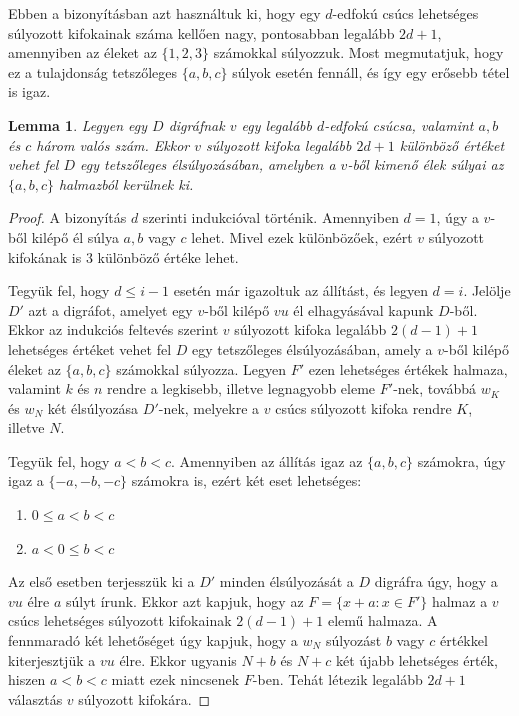 \documentclass[12pt, a4paper]{report}
\newtheorem{lem}[tét]{Lemma}
\theoremstyle{remark}
\theoremstyle{definition}
\begin{document}
Ebben a bizonyításban azt használtuk ki, hogy egy $d$-edfokú csúcs lehetséges súlyozott kifokainak száma kellően nagy, pontosabban legalább $2d + 1$, amennyiben az éleket az $\lbrace 1, 2, 3 \rbrace$ számokkal súlyozzuk. Most megmutatjuk, hogy ez a tulajdonság tetszőleges $\lbrace a, b, c \rbrace$ súlyok esetén fennáll, és így egy erősebb tétel is igaz.

\begin{lem}
Legyen egy $D$ digráfnak $v$ egy legalább $d$-edfokú csúcsa, valamint $a, b$ és $c$ három valós szám. Ekkor $v$ súlyozott kifoka legalább $2d + 1$ különböző értéket vehet fel $D$ egy tetszőleges élsúlyozásában, amelyben a $v$-ből kimenő élek súlyai az $\lbrace a, b, c \rbrace$ halmazból kerülnek ki.
\end{lem}

\begin{proof}
A bizonyítás $d$ szerinti indukcióval történik. Amennyiben $d = 1$, úgy a $v$-ből kilépő él súlya $a, b$ vagy $c$ lehet. Mivel ezek különbözőek, ezért $v$ súlyozott kifokának is $3$ különböző értéke lehet.

Tegyük fel, hogy $d \leq i - 1$ esetén már igazoltuk az állítást, és legyen $d = i$. Jelölje $D'$ azt a digráfot, amelyet egy $v$-ből kilépő $vu$ él elhagyásával kapunk $D$-ből. Ekkor az indukciós feltevés szerint $v$ súlyozott kifoka legalább $2(d - 1) + 1$ lehetséges értéket vehet fel $D$ egy tetszőleges élsúlyozásában, amely a $v$-ből kilépő éleket az $\lbrace a, b, c \rbrace$ számokkal súlyozza. Legyen $F'$ ezen lehetséges értékek halmaza, valamint $k$ és $n$ rendre a legkisebb, illetve legnagyobb eleme $F'$-nek, továbbá $w_K$ és $w_N$ két élsúlyozása $D'$-nek, melyekre a $v$ csúcs súlyozott kifoka rendre $K$, illetve $N$.

Tegyük fel, hogy $a < b < c$. Amennyiben az állítás igaz az $\lbrace a, b, c \rbrace$ számokra, úgy igaz a $\lbrace -a, -b, -c \rbrace$ számokra is, ezért két eset lehetséges:

\begin{enumerate}
\item $0 \leq a < b < c$
\item $a < 0 \leq b < c$
\end{enumerate}

Az első esetben terjesszük ki a $D'$ minden élsúlyozását a $D$ digráfra úgy, hogy a $vu$ élre $a$ súlyt írunk. Ekkor azt kapjuk, hogy az $F = \lbrace x + a: x \in F' \rbrace$ halmaz a $v$ csúcs lehetséges súlyozott kifokainak $2(d - 1) + 1$ elemű halmaza. A fennmaradó két lehetőséget úgy kapjuk, hogy a $w_N$ súlyozást $b$ vagy $c$ értékkel kiterjesztjük a $vu$ élre. Ekkor ugyanis $N + b$ és $N + c$ két újabb lehetséges érték, hiszen $a < b < c$ miatt ezek nincsenek $F$-ben. Tehát létezik legalább $2d + 1$ választás $v$ súlyozott kifokára.


\end{proof}
\end{document}
